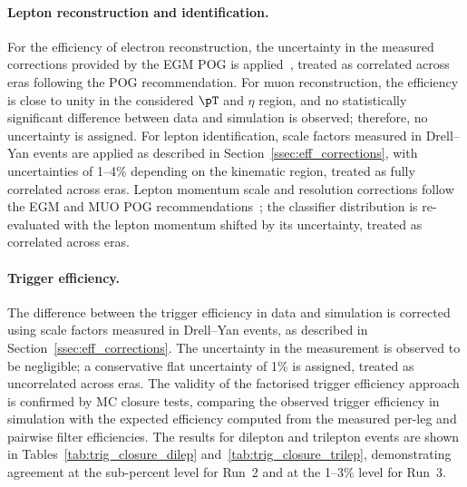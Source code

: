 \paragraph{Lepton reconstruction and identification.}
For the efficiency of electron reconstruction, the uncertainty in the measured corrections provided by the EGM POG is applied~\cite{EGMRunIIRecommendation,EGMRun3Recommendation}, treated as correlated across eras following the POG recommendation. For muon reconstruction, the efficiency is close to unity in the considered $\pT$ and $\eta$ region, and no statistically significant difference between data and simulation is observed; therefore, no uncertainty is assigned. For lepton identification, scale factors measured in Drell--Yan events are applied as described in Section~\ref{ssec:eff_corrections}, with uncertainties of 1--4\% depending on the kinematic region, treated as fully correlated across eras. Lepton momentum scale and resolution corrections follow the EGM and MUO POG recommendations~\cite{EGMRunIIRecommendation,EGMRun3Recommendation,RochCorr,RochCorr-HS}; the classifier distribution is re-evaluated with the lepton momentum shifted by its uncertainty, treated as correlated across eras.

\paragraph{Trigger efficiency.}
The difference between the trigger efficiency in data and simulation is corrected using scale factors measured in Drell--Yan events, as described in Section~\ref{ssec:eff_corrections}. The uncertainty in the measurement is observed to be negligible; a conservative flat uncertainty of 1\% is assigned, treated as uncorrelated across eras. The validity of the factorised trigger efficiency approach is confirmed by MC closure tests, comparing the observed trigger efficiency in simulation with the expected efficiency computed from the measured per-leg and pairwise filter efficiencies. The results for dilepton and trilepton events are shown in Tables~\ref{tab:trig_closure_dilep} and~\ref{tab:trig_closure_trilep}, demonstrating agreement at the sub-percent level for Run~2 and at the 1--3\% level for Run~3.

